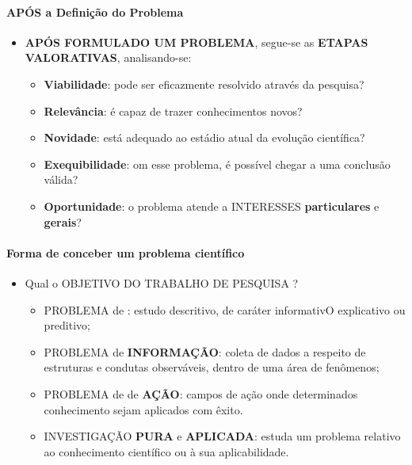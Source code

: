 \documentclass[
]{book}
\providecommand{\tightlist}{%
  \setlength{\itemsep}{0pt}\setlength{\parskip}{0pt}}
\begin{document}
\hypertarget{apuxf3s-a-definiuxe7uxe3o-do-problema}{%
\paragraph{APÓS a Definição do
Problema}\label{apuxf3s-a-definiuxe7uxe3o-do-problema}}

\begin{itemize}
\tightlist
\item
  \textbf{APÓS FORMULADO UM PROBLEMA}, segue-se as \textbf{ETAPAS
  VALORATIVAS}, analisando-se:

  \begin{itemize}
  \tightlist
  \item
    \textbf{Viabilidade}: pode ser eficazmente resolvido através da
    pesquisa?
  \item
    \textbf{Relevância}: é capaz de trazer conhecimentos novos?
  \item
    \textbf{Novidade}: está adequado ao estádio atual da evolução
    científica?
  \item
    \textbf{Exequibilidade}: om esse problema, é possível chegar a uma
    conclusão válida?
  \item
    \textbf{Oportunidade}: o problema atende a INTERESSES
    \textbf{particulares} e \textbf{gerais}?
  \end{itemize}
\end{itemize}

\hypertarget{forma-de-conceber-um-problema-cientuxedfico}{%
\paragraph{Forma de conceber um problema
científico}\label{forma-de-conceber-um-problema-cientuxedfico}}

\begin{itemize}
\tightlist
\item
  Qual o OBJETIVO DO TRABALHO DE PESQUISA ?

  \begin{itemize}
  \tightlist
  \item
    PROBLEMA de : estudo descritivo, de caráter informativO explicativo
    ou preditivo;
  \item
    PROBLEMA de \textbf{INFORMAÇÃO}: coleta de dados a respeito de
    estruturas e condutas observáveis, dentro de uma área de fenômenos;
  \item
    PROBLEMA de de \textbf{AÇÃO}: campos de ação onde determinados
    conhecimento sejam aplicados com êxito.
  \item
    INVESTIGAÇÃO \textbf{PURA} e \textbf{APLICADA}: estuda um problema
    relativo ao conhecimento científico ou à sua aplicabilidade.
  \end{itemize}
\end{itemize}
\end{document}
